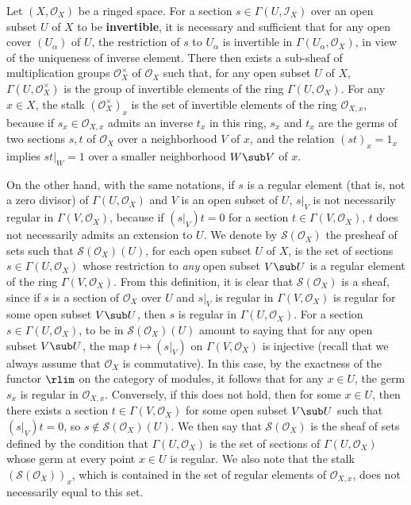 Let $(X,\mathscr{O}_X)$ be a ringed space. For a section $s\in\Gamma(U,\mathscr{I}_X)$ over an open subset $U$ of $X$ to be \textbf{invertible}, it is necessary and sufficient that for any open cover $(U_\alpha)$ of $U$, the restriction of $s$ to $U_\alpha$ is invertible in $\Gamma(U_\alpha,\mathscr{O}_X)$, in view of the uniqueness of inverse element. There then exists a sub-sheaf of multiplication groups $\mathscr{O}_X^{\times}$ of $\mathscr{O}_X$ such that, for any open subset $U$ of $X$, $\Gamma(U,\mathscr{O}_X^{\times})$ is the group of invertible elements of the ring $\Gamma(U,\mathscr{O}_X)$. For any $x\in X$, the stalk $(\mathscr{O}_X^{\times})_x$ is the set of invertible elements of the ring $\mathscr{O}_{X,x}$, because if $s_x\in\mathscr{O}_{X,x}$ admits an inverse $t_x$ in this ring, $s_x$ and $t_x$ are the germs of two sections $s,t$ of $\mathscr{O}_X$ over a neighborhood $V$ of $x$, and the relation $(st)_x=1_x$ implies $st|_W=1$ over a smaller neighborhood $W\sub V$ of $x$.\par
On the other hand, with the same notations, if $s$ is a regular element (that is, not a zero divisor) of $\Gamma(U,\mathscr{O}_X)$ and $V$ is an open subset of $U$, $s|_V$ is not necessarily regular in $\Gamma(V,\mathscr{O}_X)$, because if $(s|_V)t=0$ for a section $t\in\Gamma(V,\mathscr{O}_X)$, $t$ does not necessarily admits an extension to $U$. We denote by $\mathscr{S}(\mathscr{O}_X)$ the presheaf of sets such that $\mathscr{S}(\mathscr{O}_X)(U)$, for each open subset $U$ of $X$, is the set of sections $s\in\Gamma(U,\mathscr{O}_X)$ whose restriction to \textit{any} open subset $V\sub U$ is a regular element of the ring $\Gamma(V,\mathscr{O}_X)$. From this definition, it is clear that $\mathscr{S}(\mathscr{O}_X)$ is a sheaf, since if $s$ is a section of $\mathscr{O}_X$ over $U$ and $s|_V$ is regular in $\Gamma(V,\mathscr{O}_X)$ is regular for some open subset $V\sub U$, then $s$ is regular in $\Gamma(U,\mathscr{O}_X)$. For a section $s\in\Gamma(U,\mathscr{O}_X)$, to be in $\mathscr{S}(\mathscr{O}_X)(U)$ amount to saying that for any open subset $V\sub U$, the map $t\mapsto(s|_V)$ on $\Gamma(V,\mathscr{O}_X)$ is injective (recall that we always assume that $\mathscr{O}_X$ is commutative). In this case, by the exactness of the functor $\rlim$ on the category of modules, it follows that for any $x\in U$, the germ $s_x$ is regular in $\mathscr{O}_{X,x}$. Conversely, if this does not hold, then for some $x\in U$, then there exists a section $t\in\Gamma(V,\mathscr{O}_X)$ for some open subset $V\sub U$ such that $(s|_V)t=0$, so $s\notin\mathscr{S}(\mathscr{O}_X)(U)$. We then say that $\mathscr{S}(\mathscr{O}_X)$ is the sheaf of sets defined by the condition that $\Gamma(U,\mathscr{O}_X)$ is the set of sections of $\Gamma(U,\mathscr{O}_X)$ whose germ at every point $x\in U$ is regular. We also note that the stalk $(\mathscr{S}(\mathscr{O}_X))_x$, which is contained in the set of regular elements of $\mathscr{O}_{X,x}$, does not necessarily equal to this set.\par
